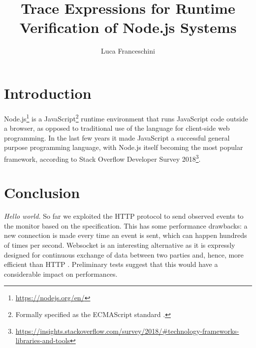 \documentclass{masterthesis}
\newcommand*\javascript{JavaScript}
\newcommand*\nodejs{Node.js}
\begin{document}
\title{Trace Expressions for Runtime Verification of \nodejs{} Systems}

\author{Luca Franceschini}



\maketitle

\tableofcontents

\chapter{Introduction}

\nodejs{}\footnote{\url{https://nodejs.org/en/}} is a \javascript{}\footnote{Formally specified as the ECMAScript standard \cite{ecmascript}.} runtime environment that runs \javascript{} code outside a browser, as opposed to traditional use of the language for client-side web programming.
In the last few years it made \javascript{} a successful general purpose programming language, with \nodejs{} itself becoming the most popular framework, according to Stack Overflow Developer Survey 2018\footnote{\url{https://insights.stackoverflow.com/survey/2018/\#technology-frameworks-libraries-and-tools}}.

\chapter{Conclusion}

{\em Hello world.}
So far we exploited the HTTP protocol to send observed events to the monitor based on the specification.
This has some performance drawbacks: a new connection is made every time an event is sent, which can happen hundreds of times per second. 
Websocket \cite{websocket} is an interesting alternative as it is expressly designed for continuous exchange of data between two parties and, hence, more efficient than HTTP .
Preliminary tests suggest that this would have a considerable impact on performances. 
  


\end{document}
